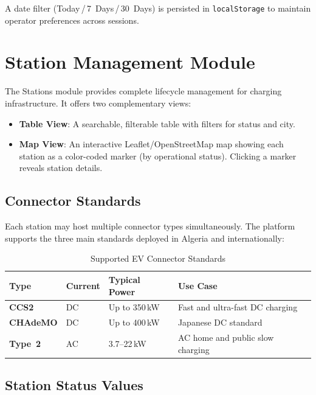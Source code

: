 \documentclass[12pt,a4paper]{report}
\begin{document}
A date filter (Today\,/\,7~Days\,/\,30~Days) is persisted in \texttt{localStorage} to maintain
operator preferences across sessions.

\section{Station Management Module}

The Stations module provides complete lifecycle management for charging infrastructure. It offers
two complementary views:

\begin{itemize}
  \item \textbf{Table View}: A searchable, filterable table with filters for status and city.
  \item \textbf{Map View}: An interactive Leaflet/OpenStreetMap map showing each station as a
        color-coded marker (by operational status). Clicking a marker reveals station details.
\end{itemize}

\subsection{Connector Standards}

Each station may host multiple connector types simultaneously. The platform supports the three
main standards deployed in Algeria and internationally:

\begin{table}[h!]
  \centering
  \caption{Supported EV Connector Standards}
  \label{tab:connectors}
  \renewcommand{\arraystretch}{1.3}
  \begin{tabular}{>{\bfseries}p{2.5cm} p{2cm} p{3cm} p{5cm}}
    \toprule
    Type      & Current & Typical Power  & Use Case \\
    \midrule
    CCS2      & DC      & Up to 350\,kW  & Fast and ultra-fast DC charging \\
    CHAdeMO   & DC      & Up to 400\,kW  & Japanese DC standard \\
    Type~2    & AC      & 3.7--22\,kW    & AC home and public slow charging \\
    \bottomrule
  \end{tabular}
\end{table}

\subsection{Station Status Values}
\end{document}
